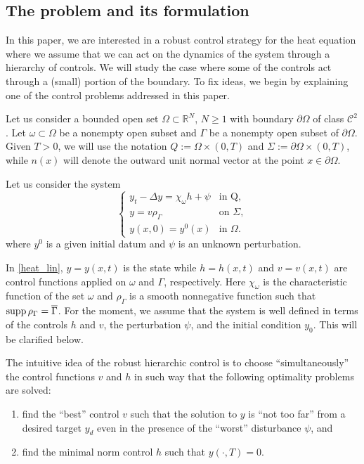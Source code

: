 \documentclass{dcds-bOF}
\theoremstyle{definition}
\def\cbd{\Gamma}
\newcommand\csin[1]{\chi_{#1}}
\def\csbd{\rho_{\Gamma}}
\def\supp{\textnormal{supp}\,}
\begin{document}
\subsection{The problem and its formulation}

In this paper, we are interested in a robust control strategy for the heat equation where we assume that we can act on the dynamics of the system through a hierarchy of controls. We will study the case where some of the controls act through a (small) portion of the boundary. To fix ideas, we begin by explaining one of the control problems addressed in this paper.

Let us consider a bounded open set $\Omega\subset \mathbb{R}^N$, $N\geq 1$ with boundary $\partial \Omega$ of class $\mathcal C^2$. Let $\omega\subset \Omega$ be a nonempty open subset and {$\cbd$ be a nonempty open subset of $\partial \Omega$}.  Given $T>0$, we will use the notation $Q:=\Omega\times(0,T)$ and $\Sigma:=\partial \Omega\times(0,T)$, while $n(x)$ will denote the outward unit normal vector at the point $x\in \partial \Omega$.

Let us consider the system
%
\begin{equation}\label{heat_lin}
\begin{cases}
y_t-\Delta y=\csin{\omega}h+\psi & \text{in Q}, \\
y=v\csbd &\text{on } \Sigma, \\
y(x,0)=y^0(x) & \text{in } \Omega.
\end{cases}
\end{equation}
%
where $y^0$ is a given initial datum and $\psi$ is an unknown perturbation.

In \eqref{heat_lin}, $y=y(x,t)$ is the state while $h=h(x,t)$ and $v=v(x,t)$ are control functions applied on $\omega$ and $\Gamma$, respectively. Here $\csin{\omega}$ is the characteristic function of the set $\omega$ and $\csbd$ is a smooth nonnegative function such that $\supp\csbd=\overline \cbd$. For the moment, we assume that the system is well defined in terms of the controls $h$ and $v$, the perturbation $\psi$, and the initial condition $y_0$. This will be clarified below.

The intuitive idea of the robust hierarchic control is to choose ``simultaneously'' the control functions  $v$ and $h$ in such way that the following optimality problems are solved:
%
\begin{enumerate}
\item find the ``best'' control $v$ such that the solution to $y$ is ``not too far'' from a desired target $y_d$ even in the presence of the ``worst'' disturbance $\psi$, and
\item find the minimal norm control $h$ such that $y(\cdot,T)=0$.
\end{enumerate}
\end{document}
